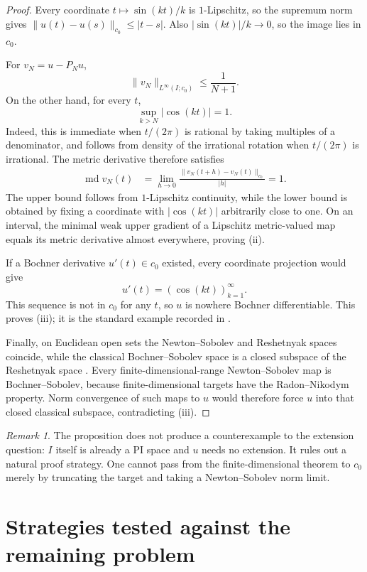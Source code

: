 \documentclass[11pt]{article}
\theoremstyle{remark}
\newtheorem{remark}[theorem]{Remark}
\begin{document}
\begin{proof}
Every coordinate $t\mapsto \sin(kt)/k$ is $1$-Lipschitz, so the supremum
norm gives
$\|u(t)-u(s)\|_{c_0}\le |t-s|$.  Also
$|\sin(kt)|/k\to0$, so the image lies in $c_0$.

For $v_N=u-P_Nu$,
\[
  \|v_N\|_{L^\infty(I;c_0)}\le\frac1{N+1}.
\]
On the other hand, for every $t$,
\[
  \sup_{k>N}|\cos(kt)|=1.
\]
Indeed, this is immediate when $t/(2\pi)$ is rational by taking multiples of
a denominator, and follows from density of the irrational rotation when
$t/(2\pi)$ is irrational.  The metric derivative therefore satisfies
\[
 \begin{split}
  \operatorname{md}v_N(t)
  &=\lim_{h\to0}
    \frac{\|v_N(t+h)-v_N(t)\|_{c_0}}{|h|}=1.
 \end{split}
\]
The upper bound follows from $1$-Lipschitz continuity, while the lower bound
is obtained by fixing a coordinate with $|\cos(kt)|$ arbitrarily close to
one.  On an interval, the minimal weak upper gradient of a Lipschitz
metric-valued map equals its metric derivative almost everywhere, proving
(ii).

If a Bochner derivative $u'(t)\in c_0$ existed, every coordinate projection
would give
\[
  u'(t)=(\cos(kt))_{k=1}^{\infty}.
\]
This sequence is not in $c_0$ for any $t$, so $u$ is nowhere Bochner
differentiable.  This proves (iii); it is the standard example recorded in
\cite{CaamanoEtAl}.

Finally, on Euclidean open sets the Newton--Sobolev and Reshetnyak spaces
coincide, while the classical Bochner--Sobolev space is a closed subspace of
the Reshetnyak space \cite{CaamanoEtAl}.  Every finite-dimensional-range
Newton--Sobolev map is Bochner--Sobolev, because finite-dimensional targets
have the Radon--Nikodym property.  Norm convergence of such maps to $u$ would
therefore force $u$ into that closed classical subspace, contradicting (iii).
\end{proof}

\begin{remark}
The proposition does not produce a counterexample to the extension question:
$I$ itself is already a PI space and $u$ needs no extension.  It rules out a
natural proof strategy.  One cannot pass from the finite-dimensional theorem
to $c_0$ merely by truncating the target and taking a Newton--Sobolev norm
limit.
\end{remark}

\section{Strategies tested against the remaining problem}
\end{document}
